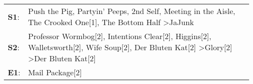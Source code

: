 \begin{supertabular}{p{0.03\textwidth}p{0.92\textwidth}}
 \textbf{S1}:  &                                                                    Push the Pig\textsuperscript{}, \enspace Partyin' Peeps\textsuperscript{}, \enspace 2nd Self\textsuperscript{}, \enspace Meeting in the Aisle\textsuperscript{}, \enspace The Crooked One[1]\textsuperscript{}, \enspace The Bottom Half\textsuperscript{} \textgreater \enspace JaJunk\textsuperscript{}  \enspace  \\
 \textbf{S2}:  &  Professor Wormbog[2]\textsuperscript{}, \enspace Intentions Clear[2]\textsuperscript{}, \enspace Higgins[2]\textsuperscript{}, \enspace Walletsworth[2]\textsuperscript{}, \enspace Wife Soup[2]\textsuperscript{}, \enspace Der Bluten Kat[2]\textsuperscript{} \textgreater \enspace Glory[2]\textsuperscript{} \textgreater \enspace Der Bluten Kat[2]\textsuperscript{}  \enspace  \\
 \textbf{E1}:  &                                                                                                                                                                                                                                                                                                                                            Mail Package[2]\textsuperscript{}  \enspace  \\
\end{supertabular}
